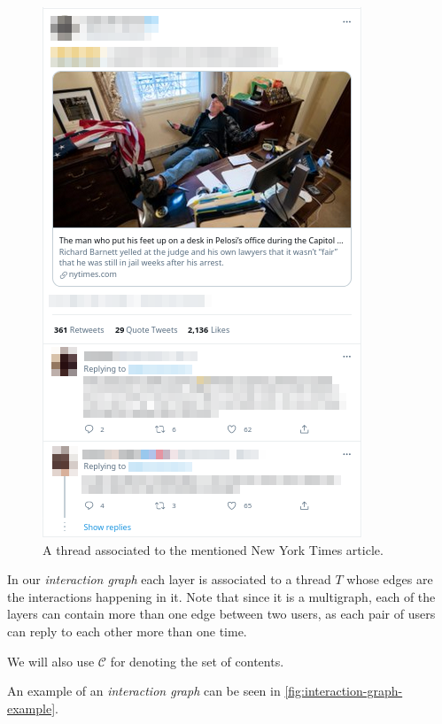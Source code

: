 \begin{figure}
	\centering
	\includegraphics[width=0.6\linewidth]{tex/img/twitter_thread.png}
	\caption[Thread-content distinction example from Twitter]{A thread
		associated to the mentioned New York Times article.}%
	\label{fig:twitter-thread}
\end{figure}

In our \emph{interaction graph} each layer is associated
to a thread $T$ whose edges are the interactions happening in it.
Note that since it is a multigraph, each of the layers can contain more than one
edge between two users, as each pair of users can reply to each other more than
one time.

We will also use $\mathcal{C} $ for denoting the set of contents.

An example of an \emph{interaction graph} can be seen in
\autoref{fig:interaction-graph-example}.

